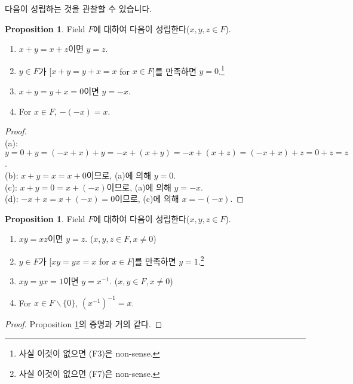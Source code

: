 \documentclass[12pt]{article}
\theoremstyle{definition}
\newtheorem{prop}[thm]{Proposition}
\begin{document}
다음이 성립하는 것을 관찰할 수 있습니다.

	\begin{prop} \label{field addition}
		Field \(F\)에 대하여 다음이 성립한다(\(x, y, z \in F\)).
		\begin{enumerate} [label=(\alph*), leftmargin=2\parindent]
			\item
			\(x + y = x + z\)이면 \(y = z\).
			\item
			\(y \in F\)가 [\(x + y = y + x = x\) for \(x \in F\)]를 만족하면 \(y = 0\).\footnote{사실 이것이 없으면 (F3)은 non-sense.}
			\item
			\(x + y = y + x = 0\)이면 \(y = -x\).
			\item
			For \(x \in F\), \(-(-x) = x\).
		\end{enumerate}
	\end{prop}
	\begin{proof}
		\quad\\
		(a): \(y = 0 + y = (-x + x) + y = -x + (x + y) = -x + (x + z) = (-x + x) + z = 0 + z = z\).\\
		(b): \(x + y = x = x + 0\)이므로, (a)에 의해 \(y=0\).\\
		(c): \(x + y = 0 = x + (-x)\)이므로, (a)에 의해 \(y = -x\).\\
		(d): \(-x + x = x + (-x) = 0\)이므로, (c)에 의해 \(x = -(-x)\).
	\end{proof}

	\begin{prop} \label{field mult}
		Field \(F\)에 대하여 다음이 성립한다(\(x, y, z \in F\)).
		\begin{enumerate} [label=(\alph*), leftmargin=2\parindent]
			\item
			\(xy = xz\)이면 \(y = z\). (\(x, y, z \in F, x \neq 0\))
			\item
			\(y \in F\)가 [\(xy = yx = x\) for \(x \in F\)]를 만족하면 \(y = 1\).\footnote{사실 이것이 없으면 (F7)은 non-sense.}
			\item
			\(xy = yx = 1\)이면 \(y = x^{-1}\). (\(x, y \in F, x \neq 0\))
			\item
			For \(x \in F \backslash \{0\}\), \((x^{-1})^{-1} = x\).
		\end{enumerate}
	\end{prop}
	\begin{proof}
		Proposition \ref{field addition}의 증명과 거의 같다.
	\end{proof}
\end{document}

